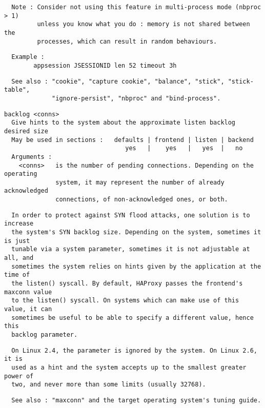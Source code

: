 \begin{verbatim}
  Note : Consider not using this feature in multi-process mode (nbproc > 1)
         unless you know what you do : memory is not shared between the
         processes, which can result in random behaviours.
\end{verbatim}

\begin{verbatim}
  Example :
        appsession JSESSIONID len 52 timeout 3h
\end{verbatim}

\begin{verbatim}
  See also : "cookie", "capture cookie", "balance", "stick", "stick-table",
             "ignore-persist", "nbproc" and "bind-process".
\end{verbatim}

\begin{verbatim}
backlog <conns>
  Give hints to the system about the approximate listen backlog desired size
  May be used in sections :   defaults | frontend | listen | backend
                                 yes   |    yes   |   yes  |   no
  Arguments :
    <conns>   is the number of pending connections. Depending on the operating
              system, it may represent the number of already acknowledged
              connections, of non-acknowledged ones, or both.
\end{verbatim}

\begin{verbatim}
  In order to protect against SYN flood attacks, one solution is to increase
  the system's SYN backlog size. Depending on the system, sometimes it is just
  tunable via a system parameter, sometimes it is not adjustable at all, and
  sometimes the system relies on hints given by the application at the time of
  the listen() syscall. By default, HAProxy passes the frontend's maxconn value
  to the listen() syscall. On systems which can make use of this value, it can
  sometimes be useful to be able to specify a different value, hence this
  backlog parameter.
\end{verbatim}

\begin{verbatim}
  On Linux 2.4, the parameter is ignored by the system. On Linux 2.6, it is
  used as a hint and the system accepts up to the smallest greater power of
  two, and never more than some limits (usually 32768).
\end{verbatim}

\begin{verbatim}
  See also : "maxconn" and the target operating system's tuning guide.
\end{verbatim}

